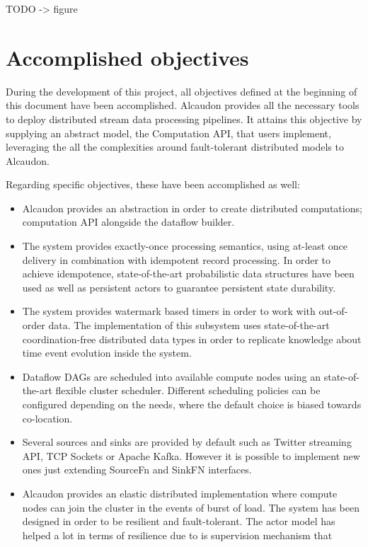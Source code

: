 TODO -> figure

\section{Accomplished objectives}

During the development of this project, all objectives defined at the beginning
of this document have been accomplished. Alcaudon provides all the necessary
tools to deploy distributed stream data processing pipelines. It attains this
objective by supplying an abstract model, the Computation \acs{API}, that users
implement, leveraging the all the complexities around fault-tolerant distributed
models to Alcaudon.

Regarding specific objectives, these have been accomplished as well:

\begin{itemize}
\item Alcaudon provides an abstraction in order to create distributed
  computations; computation \acs{API} alongside the dataflow builder.
\item The system provides exactly-once processing semantics, using at-least once
  delivery in combination with idempotent record processing. In order to achieve
  idempotence, state-of-the-art probabilistic data structures have been used as
  well as persistent actors to guarantee persistent state durability.
\item The system provides watermark based timers in order to work with
  out-of-order data. The implementation of this subsystem uses state-of-the-art
  coordination-free distributed data types in order to replicate knowledge about
  time event evolution inside the system.
\item Dataflow \acs{DAG}s are scheduled into available compute nodes using an
  state-of-the-art flexible cluster scheduler\cite{firmament}. Different scheduling
  policies can be configured depending on the needs, where the default choice is
  biased towards co-location.
\item Several sources and sinks are provided by default such as Twitter streaming
  API, TCP Sockets or Apache Kafka. However it is possible to implement new ones
  just extending SourceFn and SinkFN interfaces.
\item Alcaudon provides an elastic distributed implementation where compute
  nodes can join the cluster in the events of burst of load. The system has been
  designed in order to be resilient and fault-tolerant. The actor model has
  helped a lot in terms of resilience due to is supervision mechanism that

\end{itemize}
